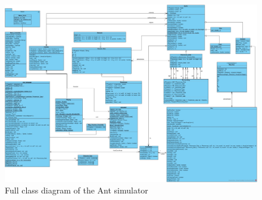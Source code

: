\documentclass[a4paper, oneside, 11pt]{report}
\begin{document}
\begin{figure}
	\begin{center}
		\includegraphics[width=1.0 \columnwidth]{Full_Class_Diagram.jpg}
		\caption{Full class diagram of the Ant simulator}
		\label{fig:Full_Class_Diagram}
	\end{center}
\end{figure}
\end{document}
